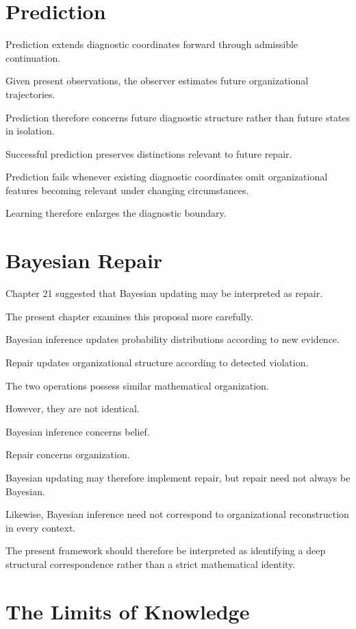 \documentclass[11pt,oneside]{book}
\numberwithin{equation}{chapter}
\theoremstyle{definition}
\theoremstyle{plain}
\begin{document}
\section{Prediction}

Prediction extends diagnostic coordinates forward through admissible
continuation.

Given present observations, the observer estimates future organizational
trajectories.

Prediction therefore concerns future diagnostic structure rather than
future states in isolation.

Successful prediction preserves distinctions relevant to future repair.

Prediction fails whenever existing diagnostic coordinates omit
organizational features becoming relevant under changing circumstances.

Learning therefore enlarges the diagnostic boundary.

\section{Bayesian Repair}

Chapter 21 suggested that Bayesian updating may be interpreted as repair.

The present chapter examines this proposal more carefully.

Bayesian inference updates probability distributions according to new
evidence.

Repair updates organizational structure according to detected violation.

The two operations possess similar mathematical organization.

However, they are not identical.

Bayesian inference concerns belief.

Repair concerns organization.

Bayesian updating may therefore implement repair, but repair need not
always be Bayesian.

Likewise, Bayesian inference need not correspond to organizational
reconstruction in every context.

The present framework should therefore be interpreted as identifying a deep
structural correspondence rather than a strict mathematical identity.

\section{The Limits of Knowledge}
\end{document}
